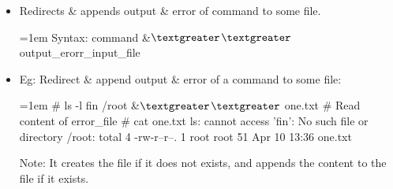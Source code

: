 \setlength{\columnsep}{3pt}
\begin{flushleft}

	\begin{itemize}
	\item Redirects \& appends output \& error of command to some file.
	\bigskip
	\begin{tcolorbox}[breakable,notitle,boxrule=-0pt,colback=pink,colframe=pink]
		\color{black}
		\font=1em
		Syntax: command \&{$\textgreater$}{$\textgreater$} output\_erorr\_input\_file
		\font=4pt
	\end{tcolorbox}
	\item
	Eg: Redirect \& append output \& error of a command to some file:
	\bigskip
	\begin{tcolorbox}[breakable,notitle,boxrule=-0pt,colback=black,colframe=black]
		\color{green}
		\font=1em
		\# ls -l fin /root \&{$\textgreater$}{$\textgreater$} one.txt
		\newline
		\newline
		\color{yellow}
		\# Read content of error\_file
		\color{green}
		\newline
		\# cat one.txt
		\newline
		\color{white}
		ls: cannot access 'fin': No such file or directory
		\newline
		/root:
		\color{white}
		\newline
		total 4
		\color{white}
		\newline
		\color{white} -rw-r--r--. 1 root root 51 Apr 10 13:36 one.txt
		\font=4pt
	\end{tcolorbox}

	\bigskip
	\begin{tcolorbox}[breakable,notitle,boxrule=1pt,colback=yellow,colframe=yellow]
		\color{black}
		Note: It creates the file if it does not exists, and appends the content to the file if it exists.
	\end{tcolorbox}
\end{itemize}
	

	
\end{flushleft}



\newpage